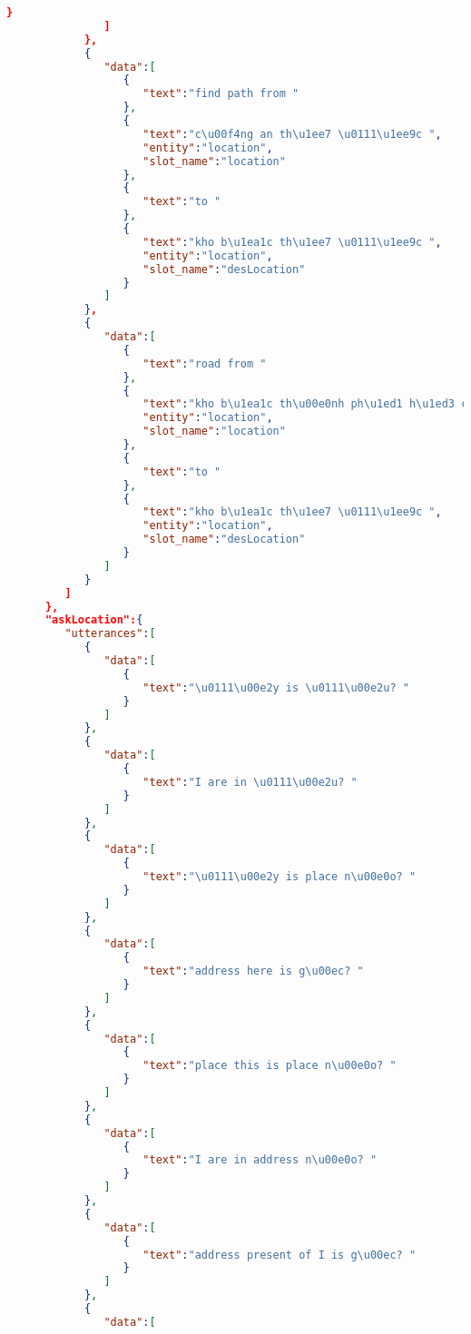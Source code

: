 \begin{lstlisting}[language=json,firstnumber=1]
                  }
               ]
            },
            {
               "data":[
                  {
                     "text":"find path from "
                  },
                  {
                     "text":"c\u00f4ng an th\u1ee7 \u0111\u1ee9c ",
                     "entity":"location",
                     "slot_name":"location"
                  },
                  {
                     "text":"to "
                  },
                  {
                     "text":"kho b\u1ea1c th\u1ee7 \u0111\u1ee9c ",
                     "entity":"location",
                     "slot_name":"desLocation"
                  }
               ]
            },
            {
               "data":[
                  {
                     "text":"road from "
                  },
                  {
                     "text":"kho b\u1ea1c th\u00e0nh ph\u1ed1 h\u1ed3 ch\u00ed minh ",
                     "entity":"location",
                     "slot_name":"location"
                  },
                  {
                     "text":"to "
                  },
                  {
                     "text":"kho b\u1ea1c th\u1ee7 \u0111\u1ee9c ",
                     "entity":"location",
                     "slot_name":"desLocation"
                  }
               ]
            }
         ]
      },
      "askLocation":{
         "utterances":[
            {
               "data":[
                  {
                     "text":"\u0111\u00e2y is \u0111\u00e2u? "
                  }
               ]
            },
            {
               "data":[
                  {
                     "text":"I are in \u0111\u00e2u? "
                  }
               ]
            },
            {
               "data":[
                  {
                     "text":"\u0111\u00e2y is place n\u00e0o? "
                  }
               ]
            },
            {
               "data":[
                  {
                     "text":"address here is g\u00ec? "
                  }
               ]
            },
            {
               "data":[
                  {
                     "text":"place this is place n\u00e0o? "
                  }
               ]
            },
            {
               "data":[
                  {
                     "text":"I are in address n\u00e0o? "
                  }
               ]
            },
            {
               "data":[
                  {
                     "text":"address present of I is g\u00ec? "
                  }
               ]
            },
            {
               "data":[

\end{lstlisting}
